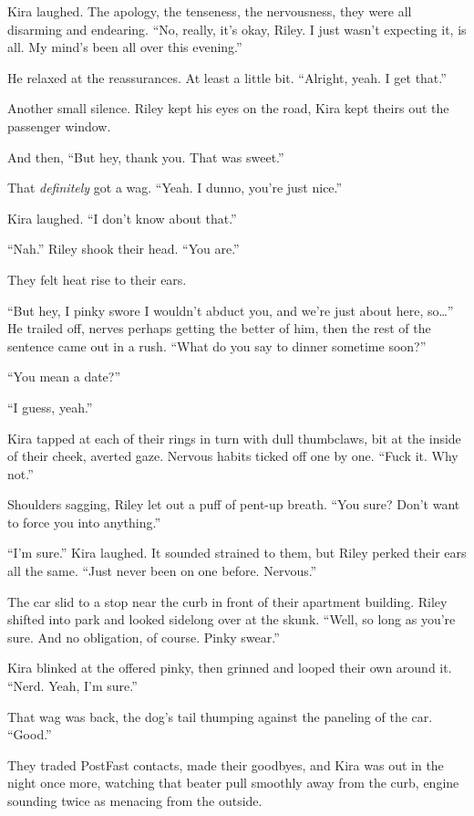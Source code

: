 Kira laughed. The apology, the tenseness, the nervousness, they were all disarming and endearing. ``No, really, it's okay, Riley. I just wasn't expecting it, is all. My mind's been all over this evening.''

He relaxed at the reassurances. At least a little bit. ``Alright, yeah. I get that.''

Another small silence. Riley kept his eyes on the road, Kira kept theirs out the passenger window.

And then, ``But hey, thank you. That was sweet.''

That \emph{definitely} got a wag. ``Yeah. I dunno, you're just nice.''

Kira laughed. ``I don't know about that.''

``Nah.'' Riley shook their head. ``You are.''

They felt heat rise to their ears.

``But hey, I pinky swore I wouldn't abduct you, and we're just about here, so\ldots{}'' He trailed off, nerves perhaps getting the better of him, then the rest of the sentence came out in a rush. ``What do you say to dinner sometime soon?''

``You mean a date?''

``I guess, yeah.''

Kira tapped at each of their rings in turn with dull thumbclaws, bit at the inside of their cheek, averted gaze. Nervous habits ticked off one by one. ``Fuck it. Why not.''

Shoulders sagging, Riley let out a puff of pent-up breath. ``You sure? Don't want to force you into anything.''

``I'm sure.'' Kira laughed. It sounded strained to them, but Riley perked their ears all the same. ``Just never been on one before. Nervous.''

The car slid to a stop near the curb in front of their apartment building. Riley shifted into park and looked sidelong over at the skunk. ``Well, so long as you're sure. And no obligation, of course. Pinky swear.''

Kira blinked at the offered pinky, then grinned and looped their own around it. ``Nerd. Yeah, I'm sure.''

That wag was back, the dog's tail thumping against the paneling of the car. ``Good.''

They traded PostFast contacts, made their goodbyes, and Kira was out in the night once more, watching that beater pull smoothly away from the curb, engine sounding twice as menacing from the outside.

